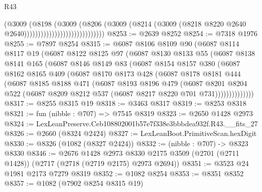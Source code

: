 \begin{lexlean}{R43}
\begin{coremodule}
                                              (@3009
                                                (@8198
                                                  (@3009
                                                    (@8206
                                                      (@3009
                                                        (@8214
                                                          (@3009
                                                            (@8218
                                                              @8220
                                                              @2640
                                                              @2640)))))))))))))))))))))))))))))
@8253 := @2639 @8252
@8254 := @7318 @1976
@8255 := @7897 @8254
@8315 := @6087
    @8106
    @8109
    @90
    (@6087
      @8114
      @8117
      @19
      (@6087
        @8122
        @8125
        @97
        (@6087
          @8130
          @8133
          @55
          (@6087
            @8138
            @8141
            @165
            (@6087
              @8146
              @8149
              @83
              (@6087
                @8154
                @8157
                @380
                (@6087
                  @8162
                  @8165
                  @409
                  (@6087
                    @8170
                    @8173
                    @428
                    (@6087
                      @8178
                      @8181
                      @444
                      (@6087
                        @8185
                        @8188
                        @471
                        (@6087
                          @8193
                          @8196
                          @479
                          (@6087
                            @8201
                            @8204
                            @522
                            (@6087 @8209 @8212 @537 (@6087 @8217 @8220 @701 @731))))))))))))))
@8317 := @8255 @8315 @19
@8318 := @3463 @8317
@8319 := @8253 @8318
@8321 := fun (nibble : @707) => @7545 @8319
@8323 := @2650 @1428 @2973
@8324 := LexLeanPreserve.Ceb108802001b57e7f338e3bbbdea932f.R43.__fits_27
@8326 := @2660 (@8324 @2424)
@8327 := LexLeanBoot.PrimitiveScan.hexDigit
@8330 := @8326 (@1082 (@8327 @2424))
@8332 := (nibble : @707) -> @8323 @8330
@8346 := @2676
    @1428
    @2973
    @8330
    @2175
    @3509
    (@2701 (@2711 @1428))
    (@2717 (@2718 (@2719 @2175) @2973 @2694))
@8351 := @3523 @24 @1981 @2173 @7279 @8319
@8352 := @1082 @8254
@8353 := @8351 @8352
@8357 := @1082 (@7902 @8254 @8315 @19)

\end{coremodule}
\end{lexlean}
